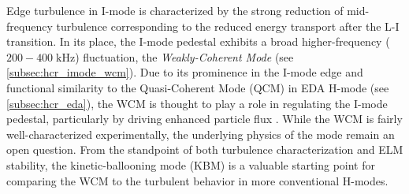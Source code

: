 \begin{figure}[t]
 \pushtooutside
\end{figure}

Edge turbulence in I-mode is characterized by the strong reduction of mid-frequency turbulence corresponding to the reduced energy transport after the L-I transition.  In its place, the I-mode pedestal exhibits a broad higher-frequency ($200-400\;\si{\kilo\hertz}$) fluctuation, the \emph{Weakly-Coherent Mode} \cite{Whyte2010,Hubbard2011,Cziegler2013} (see \cref{subsec:hcr_imode_wcm}).  Due to its prominence in the I-mode edge and functional similarity to the Quasi-Coherent Mode (QCM) in EDA H-mode \cite{Hubbard2001} (see \cref{subsec:hcr_eda}), the WCM is thought to play a role in regulating the I-mode pedestal, particularly by driving enhanced particle flux \cite{Dominguez2012}.  While the WCM is fairly well-characterized experimentally, the underlying physics of the mode remain an open question.  From the standpoint of both turbulence characterization and ELM stability, the kinetic-ballooning mode (KBM) is a valuable starting point for comparing the WCM to the turbulent behavior in more 
conventional H-modes.

